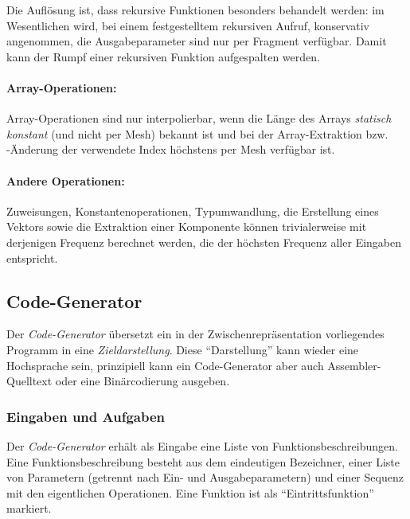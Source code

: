 \documentclass[twoside,a4paper,fleqn,12pt]{article}
\begin{document}
Die Auflösung ist, dass rekursive Funktionen besonders behandelt werden: im Wesentlichen wird, bei einem festgestelltem
rekursiven Aufruf, konservativ angenommen, die Ausgabeparameter sind nur per Fragment verfügbar. Damit kann der Rumpf
einer rekursiven Funktion aufgespalten werden.



% 

\paragraph{Array-Operationen:} Array-Operationen sind nur interpolierbar, wenn die Länge des Arrays \emph{statisch konstant}
(und nicht per Mesh) bekannt ist und bei der Array-Extraktion bzw. -Änderung der verwendete Index höchstens per Mesh
verfügbar ist.

\paragraph{Andere Operationen:} Zuweisungen, Konstantenoperationen, Typumwandlung, die Erstellung eines Vektors sowie
die Extraktion einer Komponente können trivialerweise mit derjenigen Frequenz berechnet werden, die der höchsten Frequenz
aller Eingaben entspricht.


\subsection{Code-Generator}

Der \emph{Code-Generator} übersetzt ein in der Zwischenrepräsentation vorliegendes Programm in eine \emph{Zieldarstellung}.
Diese "`Darstellung"' kann wieder eine Hochsprache sein, prinzipiell kann ein Code-Generator aber auch Assembler-Quelltext oder eine
Binärcodierung ausgeben.

\subsubsection{Eingaben und Aufgaben}

Der \emph{Code-Generator} erhält als Eingabe eine Liste von Funktionsbeschreibungen.
Eine Funktionsbeschreibung besteht aus dem eindeutigen Bezeichner, einer Liste von Parametern (getrennt nach Ein- und Ausgabeparametern)
und einer Sequenz mit den eigentlichen Operationen. Eine Funktion ist als "`Eintrittsfunktion"' markiert.
\end{document}
